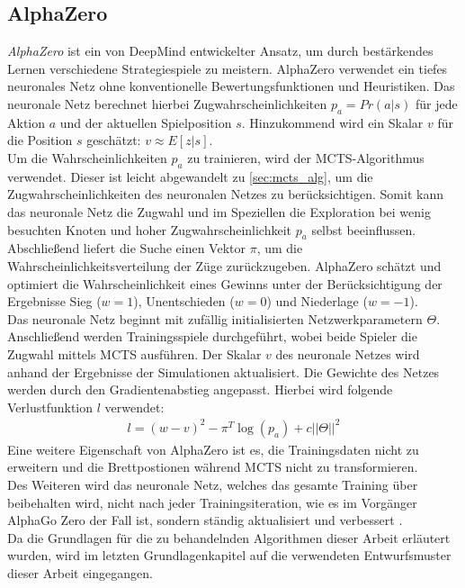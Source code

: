 \documentclass[12pt,a4paper,bibliography=totocnumbered,listof=totocnumbered]{article}
\begin{document}
\subsection{AlphaZero} \label{sec:alphazero}
\emph{AlphaZero} ist ein von DeepMind entwickelter Ansatz, um durch bestärkendes Lernen verschiedene Strategiespiele zu meistern. AlphaZero verwendet ein tiefes neuronales Netz ohne konventionelle Bewertungsfunktionen und Heuristiken. Das neuronale Netz berechnet hierbei Zugwahrscheinlichkeiten $p_{a} = Pr(a|s)$ für jede Aktion $a$ und der aktuellen Spielposition $s$. Hinzukommend wird ein Skalar $v$ für die Position $s$ geschätzt: $v \approx E[z|s]$.\\
Um die Wahrscheinlichkeiten $p_{a}$ zu trainieren, wird der MCTS-Algorithmus verwendet. Dieser ist leicht abgewandelt zu \autoref{sec:mcts_alg}, um die Zugwahrscheinlichkeiten des neuronalen Netzes zu berücksichtigen. Somit kann das neuronale Netz die Zugwahl und im Speziellen die Exploration bei wenig besuchten Knoten und hoher Zugwahrscheinlichkeit $p_{a}$ selbst beeinflussen. Abschließend liefert die Suche einen Vektor $\pi$, um die Wahrscheinlichkeitsverteilung der Züge zurückzugeben. AlphaZero schätzt und optimiert die Wahrscheinlichkeit eines Gewinns unter der Berücksichtigung der Ergebnisse Sieg ($w=1$), Unentschieden ($w=0$) und Niederlage ($w=-1$).\\
Das neuronale Netz beginnt mit zufällig initialisierten Netzwerkparametern $\Theta$. Anschließend werden Trainingsspiele durchgeführt, wobei beide Spieler die Zugwahl mittels MCTS ausführen. Der Skalar $v$ des neuronale Netzes wird anhand der Ergebnisse der Simulationen aktualisiert. Die Gewichte des Netzes werden durch den Gradientenabstieg angepasst. Hierbei wird folgende Verlustfunktion $l$ verwendet:
\begin{align}
l = (w-v)^2 - \pi^{T} \log{(p_a)} + c ||\Theta||^2
\end{align}
Eine weitere Eigenschaft von AlphaZero ist es, die Trainingsdaten nicht zu erweitern und die Brettpostionen während MCTS nicht zu transformieren.\\
Des Weiteren wird das neuronale Netz, welches das gesamte Training über beibehalten wird, nicht nach jeder Trainingsiteration, wie es im Vorgänger AlphaGo Zero der Fall ist, sondern ständig aktualisiert und verbessert \citep{Silver.05.12.2017}.\\Da die Grundlagen für die zu behandelnden Algorithmen dieser Arbeit erläutert wurden, wird im letzten Grundlagenkapitel auf die verwendeten Entwurfsmuster dieser Arbeit eingegangen.
\end{document}
